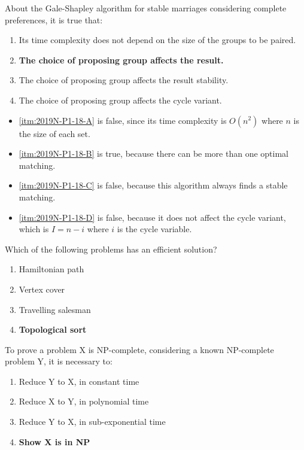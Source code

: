 {
About the Gale-Shapley algorithm for stable marriages considering complete preferences, it is true that:
\begin{enumerate}[label=\Alph*)]\itemsep0em
    \item \label{itm:2019N-P1-18-A} Its time complexity does not depend on the size of the groups to be paired.
    \item \label{itm:2019N-P1-18-B} \textbf{The choice of proposing group affects the result. \greencheckmark}
    \item \label{itm:2019N-P1-18-C} The choice of proposing group affects the result stability.
    \item \label{itm:2019N-P1-18-D} The choice of proposing group affects the cycle variant.
\end{enumerate}

\ansseparator

\begin{itemize}
    \item[] \ref{itm:2019N-P1-18-A} is false, since its time complexity is $O(n^2)$ where $n$ is the size of each set.
    \item[] \ref{itm:2019N-P1-18-B} is true, because there can be more than one optimal matching.
    \item[] \ref{itm:2019N-P1-18-C} is false, because this algorithm always finds a stable matching.
    \item[] \ref{itm:2019N-P1-18-D} is false, because it does not affect the cycle variant, which is $I = n-i$ where $i$ is the cycle variable.  
\end{itemize}

Which of the following problems has an efficient solution?
\begin{enumerate}[label=\Alph*)]\itemsep0em
    \item Hamiltonian path
    \item Vertex cover
    \item Travelling salesman
    \item \textbf{Topological sort \greencheckmark}
\end{enumerate}

To prove a problem X is NP-complete, considering a known NP-complete problem Y, it is necessary to:
\begin{enumerate}[label=\Alph*)]\itemsep0em
    \item Reduce Y to X, in constant time
    \item Reduce X to Y, in polynomial time
    \item Reduce Y to X, in sub-exponential time
    \item \textbf{Show X is in NP \greencheckmark}
\end{enumerate}

}
